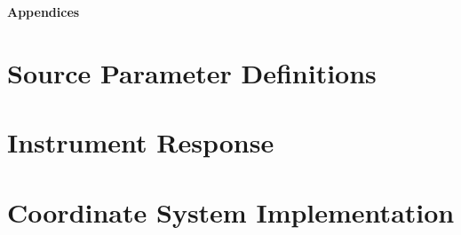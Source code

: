 \documentclass[12pt]{article}
\begin{document}
\newpage
\begin{titlepage}
  \centering
  \vspace*{4cm}
  \textbf{\Large Appendices}
  \vfill
\end{titlepage}

\newpage
\appendix
\section{Source Parameter Definitions}


\section{Instrument Response}


\section{Coordinate System Implementation}


\end{document}

